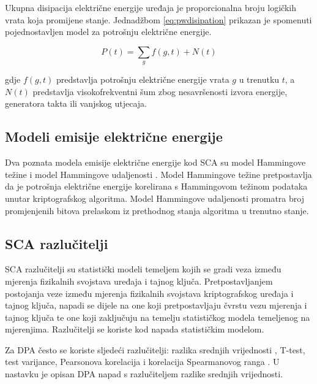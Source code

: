 \documentclass[times, utf8, numeric, diplomski]{fer}
\def\todoimg#1{\begin{center} \textcolor{red}{\big[ IMAGE: \textit{#1} \big]} \end{center}}
\begin{document}

Ukupna disipacija električne energije uređaja je proporcionalna broju logičkih vrata koja promijene stanje. Jednadžbom \eqref{eq:pwdisipation} prikazan je spomenuti pojednostavljen model za potrošnju električne energije.

\begin{equation}
\label{eq:pwdisipation}
P\left(t\right) = \sum_{g}{} f\left(g,t\right) + N\left(t\right)
\end{equation}

\noindent gdje $f(g,t)$ predstavlja potrošnju električne energije vrata $g$ u trenutku $t$, a $N(t)$ predstavlja visokofrekventni šum zbog nesavršenosti izvora energije, generatora takta ili vanjskog utjecaja.

\subsection{Modeli emisije električne energije}
Dva poznata modela emisije električne energije  kod SCA su model Hammingove težine  i model Hammingove udaljenosti . Model Hammingove težine pretpostavlja da je potrošnja električne energije korelirana s Hammingovom težinom podataka unutar kriptografskog algoritma. Model Hammingove udaljenosti promatra broj promjenjenih bitova  prelaskom iz prethodnog stanja algoritma u trenutno stanje.

\subsection{SCA razlučitelji}
SCA razlučitelji  su statistički modeli temeljem kojih se gradi veza između mjerenja fizikalnih svojstava uređaja i tajnog ključa. Pretpostavljanjem postojanja veze između mjerenja fizikalnih svojstava kriptografskog uređaja i tajnog ključa, napadi se dijele na one koji pretpostavljaju čvrstu vezu mjerenja i tajnog ključa te one koji zaključuju na temelju statističkog modela temeljenog na mjerenjima. Razlučitelji se koriste kod napada statističkim modelom.

Za DPA često se koriste sljedeći razlučitelji: razlika srednjih vrijednosti , T-test, test varijance, Pearsonova korelacija i korelacija Spearmanovog ranga  \citep{gierlichs2009empirical}. U nastavku je opisan DPA napad s razlučiteljem razlike srednjih vrijednosti.
\end{document}
